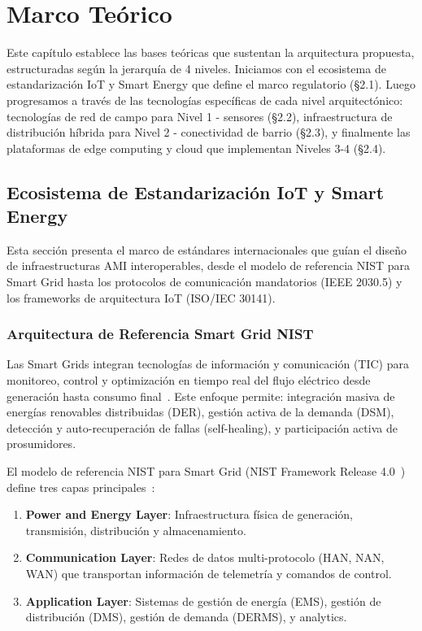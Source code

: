 ﻿\chapter{Marco Teórico}

Este capítulo establece las bases teóricas que sustentan la arquitectura propuesta, estructuradas según la jerarquía de 4 niveles. Iniciamos con el ecosistema de estandarización IoT y Smart Energy que define el marco regulatorio (§2.1). Luego progresamos a través de las tecnologías específicas de cada nivel arquitectónico: tecnologías de red de campo para Nivel 1 - sensores (§2.2), infraestructura de distribución híbrida para Nivel 2 - conectividad de barrio (§2.3), y finalmente las plataformas de edge computing y cloud que implementan Niveles 3-4 (§2.4).

\section{Ecosistema de Estandarización IoT y Smart Energy}

Esta sección presenta el marco de estándares internacionales que guían el diseño de infraestructuras AMI interoperables, desde el modelo de referencia NIST para Smart Grid hasta los protocolos de comunicación mandatorios (IEEE 2030.5) y los frameworks de arquitectura IoT (ISO/IEC 30141).

\subsection{Arquitectura de Referencia Smart Grid NIST}

Las Smart Grids integran tecnologías de información y comunicación (TIC) para monitoreo, control y optimización en tiempo real del flujo eléctrico desde generación hasta consumo final~\cite{SmartHomeEnergy2024,velasquezSmartGridsEmpowered2024}. Este enfoque permite: integración masiva de energías renovables distribuidas (DER), gestión activa de la demanda (DSM), detección y auto-recuperación de fallas (self-healing), y participación activa de prosumidores.

El modelo de referencia NIST para Smart Grid (NIST Framework Release 4.0~\cite{NISTFramework2022}) define tres capas principales~\cite{alsuwaidiSecuringSmartGrid2024}:

\begin{enumerate}
\item \textbf{Power and Energy Layer}: Infraestructura física de generación, transmisión, distribución y almacenamiento.
\item \textbf{Communication Layer}: Redes de datos multi-protocolo (HAN, NAN, WAN) que transportan información de telemetría y comandos de control.
\item \textbf{Application Layer}: Sistemas de gestión de energía (EMS), gestión de distribución (DMS), gestión de demanda (DERMS), y analytics.
\end{enumerate}

